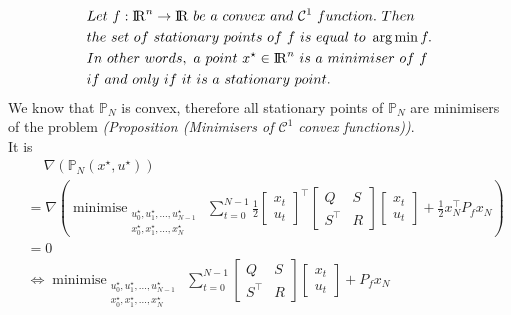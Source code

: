 \documentclass[a4paper,11pt,reqno]{amsart}
\newcommand{\R}{{\rm I\!R}}
\newcommand{\tran}{\intercal}
\DeclareMathOperator*{\argmin}{arg\,min}
\DeclareMathOperator*{\minimise}{minimise}
\begin{document}
\begin{align}
    &Let\ f : \R^n\rightarrow\R\ be\ a\ convex\ and\ \mathcal{C}^1\ function.\ Then
    \notag
    \\
    &the\ set\ of\ stationary\ points\ of\ f\ is\ equal\ to\ \argmin f.
    \notag
    \\
    &In\ other\ words,\ a\ point\ x^{\star}\in\R^n\ is\ a\ minimiser\ of\ f\ 
    \notag
    \\
    &if\ and\ only\ if\ it\ is\ a\ stationary\ point.
    \notag
\end{align}
We know that $\mathbb{P}_N$ is convex, therefore all stationary
points of $\mathbb{P}_N$ are minimisers of the problem \textit{(Proposition (Minimisers of $\mathcal{C}^1$ convex functions))}.
\\
It is 
\begin{align}
    &\quad \ \nabla (\mathbb{P}_N(x^{\star},u^{\star}))
    \\
    &=\nabla \left(
        \minimise_{\substack{u^{\star}_0,u^{\star}_1,\ldots,u^{\star}_{N-1}\\ x^{\star}_0,x^{\star}_1,\ldots,x^{\star}_N}} \,
        \sum_{t=0}^{N-1}\tfrac{1}{2}
        \begin{bmatrix}
            x_t\\
            u_t
        \end{bmatrix}^{\tran}
        \begin{bmatrix}
            Q&S\\
            S^{\tran}&R
        \end{bmatrix}
        \begin{bmatrix}
            x_t\\
            u_t
        \end{bmatrix}
        +\tfrac{1}{2}x_N^{\tran}P_fx_N\right) 
    \\
    &= 0
    \\
    &\Longleftrightarrow 
    \minimise_{\substack{u^{\star}_0,u^{\star}_1,\ldots,u^{\star}_{N-1}\\ x^{\star}_0,x^{\star}_1,\ldots,x^{\star}_N}} \,
    \sum_{t=0}^{N-1}
    \begin{bmatrix}
        Q&S\\
        S^{\tran}&R
    \end{bmatrix}
    \begin{bmatrix}
        x_t\\
        u_t
    \end{bmatrix}
    +P_fx_N
    \label{eq:P_N_minimiser}
\end{align}
\end{document}
